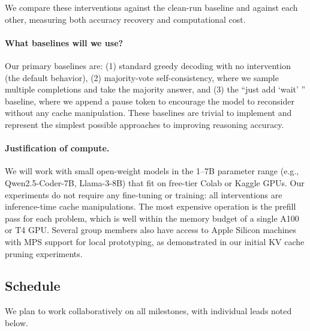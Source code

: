 \documentclass[11pt,a4paper]{article}
\begin{document}
We compare these interventions against the clean-run baseline and against each other, measuring both accuracy recovery and computational cost.

\paragraph{What baselines will we use?}
Our primary baselines are: (1) standard greedy decoding with no intervention (the default behavior), (2) majority-vote self-consistency, where we sample multiple completions and take the majority answer, and (3) the ``just add `wait' '' baseline, where we append a pause token to encourage the model to reconsider without any cache manipulation.
These baselines are trivial to implement and represent the simplest possible approaches to improving reasoning accuracy.

\paragraph{Justification of compute.}
We will work with small open-weight models in the 1--7B parameter range (e.g., Qwen2.5-Coder-7B, Llama-3-8B) that fit on free-tier Colab or Kaggle GPUs.
Our experiments do not require any fine-tuning or training: all interventions are inference-time cache manipulations.
The most expensive operation is the prefill pass for each problem, which is well within the memory budget of a single A100 or T4 GPU.
Several group members also have access to Apple Silicon machines with MPS support for local prototyping, as demonstrated in our initial KV cache pruning experiments.

\subsection{Schedule}

We plan to work collaboratively on all milestones, with individual leads noted below.
\end{document}
